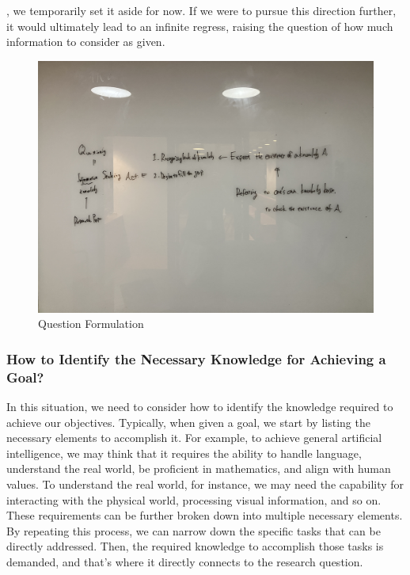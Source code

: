 \documentclass{book}
\begin{document}
, we temporarily set it aside for now. If we were to pursue this direction further, it would ultimately lead to an infinite regress, raising the question of how much information to consider as given.

\begin{figure}[htb]
    \centering
    \includegraphics[width=\textwidth]{figs/question_formulation.jpg}
    \caption{Question Formulation}
    \label{fig:enter-label}
\end{figure}

\subsubsection{How to Identify the Necessary Knowledge for Achieving a Goal?}
In this situation, we need to consider how to identify the knowledge required to achieve our objectives. Typically, when given a goal, we start by listing the necessary elements to accomplish it. For example, to achieve general artificial intelligence, we may think that it requires the ability to handle language, understand the real world, be proficient in mathematics, and align with human values. To understand the real world, for instance, we may need the capability for interacting with the physical world, processing visual information, and so on. These requirements can be further broken down into multiple necessary elements. By repeating this process, we can narrow down the specific tasks that can be directly addressed. Then, the required knowledge to accomplish those tasks is demanded, and that's where it directly connects to the research question.
\end{document}

